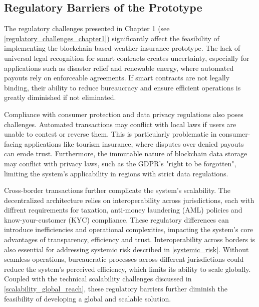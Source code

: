 \subsection{Regulatory Barriers of the Prototype}
The regulatory challenges presented in Chapter 1 (see \cref{regulatory_challenges_chapter1}) significantly affect the feasibility of implementing the blockchain-based weather insurance prototype. The lack of universal legal recognition for smart contracts creates uncertainty, especially for applications such as disaster relief and renewable energy, where automated payouts rely on enforceable agreements. If smart contracts are not legally binding, their ability to reduce bureaucracy and ensure efficient operations is greatly diminished if not eliminated.

Compliance with consumer protection and data privacy regulations also poses challenges. Automated transactions may conflict with local laws if users are unable to contest or reverse them. This is particularly problematic in consumer-facing applications like tourism insurance, where disputes over denied payouts can erode trust. Furthermore, the immutable nature of blockchain data storage may conflict with privacy laws, such as the GDPR's "right to be forgotten", limiting the system's applicability in regions with strict data regulations.

Cross-border transactions further complicate the system's scalability. The decentralized architecture relies on interoperability across jurisdictions, each with diffrent requirements for taxation, anti-money laundering (AML) policies and know-your-customer (KYC) compliance. These regulatory differences can introduce inefficiencies and operational complexities, impacting the system's core advantages of transparency, efficiency and trust. Interoperability across borders is also essential for addressing systemic risk described in \cref{systemic_risk}. Without seamless operations, bureaucratic processes across different jurisdictions could reduce the system's perceived efficiency, which limits its ability to scale globally. Coupled with the technical scalability challenges discussed in \cref{scalability_global_reach}, these regulatory barriers further diminish the feasibility of developing a global and scalable solution.
